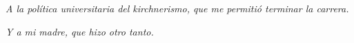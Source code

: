 
\hfill \textit{A la política universitaria del kirchnerismo, que me permitió terminar la carrera.}


\medskip

\hfill \textit{Y a mi madre, que hizo otro tanto.}